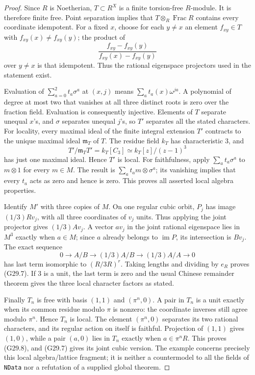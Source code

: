 \begin{proof}
Since $R$ is Noetherian, $T\subset R^X$ is a finite
torsion-free $R$-module.  It is therefore finite free.
Point separation implies that $T\otimes_R\operatorname{Frac}R$
contains every coordinate idempotent.  For a fixed $x$, choose
for each $y\ne x$ an element $f_{xy}\in T$ with
$f_{xy}(x)\ne f_{xy}(y)$; the product of
\[
       \frac{f_{xy}-f_{xy}(y)}{f_{xy}(x)-f_{xy}(y)}
\]
over $y\ne x$ is that idempotent.  Thus the rational
eigenspace projectors used in the statement exist.

Evaluation of $\sum_{a=0}^2t_a\sigma^a$ at $(x,j)$
means $\sum_a t_a(x)\omega^{ja}$.  A polynomial of degree
at most two that vanishes at all three distinct roots is
zero over the fraction field.  Evaluation is consequently
injective.  Elements of $T$ separate unequal $x$'s, and
$\sigma$ separates unequal $j$'s, so $T'$ separates all
the stated characters.
For locality, every maximal ideal of the finite integral
extension $T'$ contracts to the unique maximal ideal
$\mathfrak m_T$ of $T$.
The residue field $k_T$ has characteristic $3$, and
\[
        T'/\mathfrak m_TT'=k_T[C_3]
                    \simeq k_T[z]/(z-1)^3
\]
has just one maximal ideal.  Hence $T'$ is local.
For faithfulness, apply $\sum_a t_a\sigma^a$ to
$m\otimes1$ for every $m\in M$.
The result is $\sum_a t_am\otimes\sigma^a$; its
vanishing implies that every $t_a$ acts as zero and hence
is zero.  This proves all asserted local algebra properties.

Identify $M'$ with three copies of $M$.
On one regular cubic orbit, $P_j$ has image
$(1/3)Rv_j$, with all three coordinates of $v_j$ units.
Thus applying the joint projector gives $(1/3)A v_j$.
A vector $a v_j$ in the joint rational eigenspace lies in
$M^3$ exactly when $a\in M$; since $a$ already belongs
to $\operatorname{im}P$, its intersection is $Bv_j$.
The exact sequence
\[
 0\longrightarrow A/B\longrightarrow (1/3)A/B
       \longrightarrow (1/3)A/A\longrightarrow0
\]
has last term isomorphic to $(R/3R)^r$.
Taking lengths and dividing by $e_R$ proves (G29.7).
If $3$ is a unit, the last term is zero and the usual
Chinese remainder theorem gives the three local character
factors as stated.

Finally $T_n$ is free with basis $(1,1)$ and $(\pi^n,0)$.
A pair in $T_n$ is a unit exactly when its common residue
modulo $\pi$ is nonzero: the coordinate inverses still
agree modulo $\pi^n$.  Hence $T_n$ is local.  The element
$(\pi^n,0)$ separates its two rational characters, and
its regular action on itself is faithful.  Projection of
$(1,1)$ gives $(1,0)$, while a pair $(a,0)$ lies in
$T_n$ exactly when $a\in\pi^nR$.
This proves (G29.8), and (G29.7) gives its joint cubic
version.  The example concerns precisely this local
algebra/lattice fragment; it is neither a countermodel to
all the fields of \texttt{NData} nor a refutation of a
supplied global theorem.
\end{proof}

